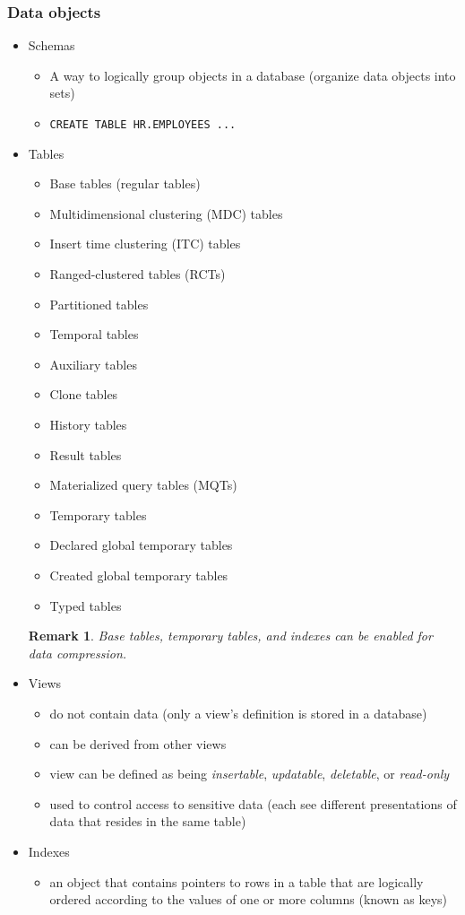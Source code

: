\documentclass{article}
\newtheorem*{remark}{Remark}
\begin{document}
\subsubsection{Data objects}
\begin{itemize}
\item Schemas
	\begin{itemize}
	\item A way to logically group objects in a database (organize data objects into sets)
	\item \texttt{CREATE TABLE HR.EMPLOYEES ...}
	\end{itemize}
\item Tables
	\begin{itemize}
	\item Base tables (regular tables)
	\item {\color{green} Multidimensional clustering (MDC) tables}
	\item {\color{green} Insert time clustering (ITC) tables}
	\item {\color{green} Ranged-clustered tables (RCTs)}
	\item Partitioned tables
	\item Temporal tables
	\item {\color{red} Auxiliary tables}
	\item {\color{red} Clone tables}
	\item History tables
	\item Result tables
	\item Materialized query tables (MQTs)
	\item Temporary tables
	\item Declared global temporary tables
	\item Created global temporary tables
	\item {\color{green} Typed tables}
	\end{itemize}
	\begin{remark}
	Base tables, temporary tables, and indexes can be enabled for data compression.
	\end{remark}
\item Views
	\begin{itemize}
	\item do not contain data (only a view's definition is stored in a database)
	\item can be derived from other views
	\item view can be defined as being \textit{insertable}, \textit{updatable}, \textit{deletable},
	or \textit{read-only}
	\item used to control access to sensitive data (each see different presentations of data that 
	resides in the same table)
	\end{itemize}
\item Indexes
	\begin{itemize}
	\item an object that contains pointers to rows in a table that are logically ordered according to
	the values of one or more columns (known as keys)
	

\end{itemize}
\end{itemize}
\end{document}
